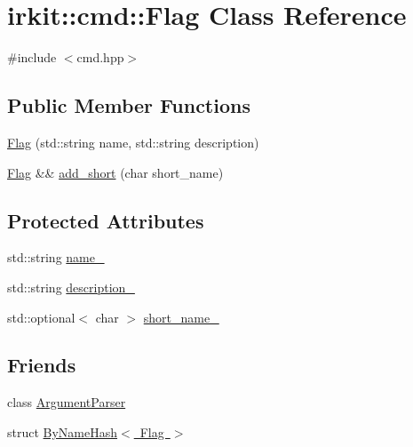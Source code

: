 \hypertarget{classirkit_1_1cmd_1_1Flag}{}\section{irkit\+:\+:cmd\+:\+:Flag Class Reference}
\label{classirkit_1_1cmd_1_1Flag}


{\ttfamily \#include $<$cmd.\+hpp$>$}

\subsection*{Public Member Functions}
\begin{DoxyCompactItemize}
\item 
\mbox{\hyperlink{classirkit_1_1cmd_1_1Flag_a666a5e9fa73558c3a67535a0bc336219}{Flag}} (std\+::string name, std\+::string description)
\item 
\mbox{\hyperlink{classirkit_1_1cmd_1_1Flag}{Flag}} \&\& \mbox{\hyperlink{classirkit_1_1cmd_1_1Flag_ab094433d7cda97b5eb8e9366081e4da6}{add\+\_\+short}} (char short\+\_\+name)
\end{DoxyCompactItemize}
\subsection*{Protected Attributes}
\begin{DoxyCompactItemize}
\item 
std\+::string \mbox{\hyperlink{classirkit_1_1cmd_1_1Flag_ae34f55b6ae9d2b5f5409881dfe347638}{name\+\_\+}}
\item 
std\+::string \mbox{\hyperlink{classirkit_1_1cmd_1_1Flag_a6ba7ee322bc1c18cabc0c5ef8fdacda0}{description\+\_\+}}
\item 
std\+::optional$<$ char $>$ \mbox{\hyperlink{classirkit_1_1cmd_1_1Flag_a0bfb19b466585afe43271433459f04e9}{short\+\_\+name\+\_\+}}
\end{DoxyCompactItemize}
\subsection*{Friends}
\begin{DoxyCompactItemize}
\item 
class \mbox{\hyperlink{classirkit_1_1cmd_1_1Flag_a55c9e1ac006a645af402e3aee6b64e00}{Argument\+Parser}}
\item 
struct \mbox{\hyperlink{classirkit_1_1cmd_1_1Flag_ac108a43e1fe1a47dcdb8a9d1fd59ec0e}{By\+Name\+Hash$<$ Flag $>$}}
\end{DoxyCompactItemize}


